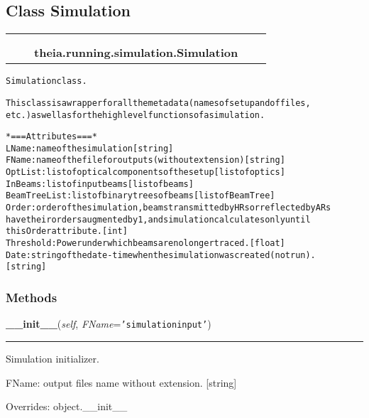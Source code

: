 \subsection{Class Simulation}

    \label{theia:running:simulation:Simulation}
\begin{tabular}{cccccc}
\multicolumn{2}{r}{\settowidth{\BCL}{object}\multirow{2}{\BCL}{object}}
&&
  \\\cline{3-3}
  &&\multicolumn{1}{c|}{}
&&
  \\
&&\multicolumn{2}{l}{\textbf{theia.running.simulation.Simulation}}
\end{tabular}

\begin{alltt}


Simulation class.

This class is a wrapper for all the metadata (names of setup and of files,
etc.) as well as for the high level functions of a simulation.

*=== Attributes ===*
LName: name of the simulation [string]
FName: name of the file for outputs (without extension) [string]
OptList: list of optical components of the setup [list of optics]
InBeams: list of input beams [list of beams]
BeamTreeList: list of binary trees of beams [list of BeamTree]
Order: order of the simulation, beams transmitted by HRs or reflected by ARs
    have their orders augmented by 1, and simulation calculates only until
    this Order attribute. [int]
Threshold: Power under which beams are no longer traced. [float]
Date: string of the date-time when the simulation was created (not run).
    [string]
\end{alltt}



  \subsubsection{Methods}

    \vspace{0.5ex}

\hspace{.8\funcindent}\begin{boxedminipage}{\funcwidth}

    \raggedright \textbf{\_\_init\_\_}(\textit{self}, \textit{FName}={\tt \texttt{'}\texttt{simulationinput}\texttt{'}})

    \vspace{-1.5ex}

    \rule{\textwidth}{0.5\fboxrule}
\setlength{\parskip}{2ex}
    Simulation initializer.

    FName: output files name without extension. [string]

\setlength{\parskip}{1ex}
      Overrides: object.\_\_init\_\_

    \end{boxedminipage}

